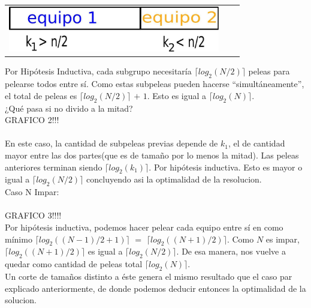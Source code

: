         {\begin{tabular}{ccc}
         \includegraphics[height=2cm]{graficos/kaioken-desarrollo-1.jpg} 

          \end{tabular}}

        Por Hipótesis Inductiva, cada subgrupo necesitaría $\lceil log_{2}(N/2) \rceil$ peleas para pelearse todos entre sí. Como estas subpeleas pueden hacerse “simultáneamente”, el total de peleas es $\lceil log_{2}(N/2) \rceil$ $+$ $1$. Esto es igual a $\lceil log_{2}(N) \rceil$. \\

        ¿Qué pasa si no divido a la mitad?\\


        GRAFICO 2!!!\\
        \\

        En este caso, la cantidad de subpeleas previas depende de $k_{1}$, el de cantidad mayor entre las dos partes(que es de tamaño por lo menos la mitad). Las peleas anteriores terminan siendo $\lceil log_{2}(k_{1}) \rceil$. Por hipótesis inductiva. Esto es mayor o igual a $\lceil log_{2}(N/2) \rceil$ concluyendo asi la optimalidad de la resolucion. \\

        Caso N Impar: \\
        \\

        GRAFICO 3!!!!
        \\

        Por hipótesis inductiva, podemos hacer pelear cada equipo entre sí en como mínimo $\lceil log_{2}((N-1)/2+1) \rceil$ $=$ $\lceil log_{2}((N+1)/2) \rceil$. Como $N$ es impar, $\lceil log_{2}((N+1)/2) \rceil$ es igual a $\lceil log_{2}(N/2) \rceil$. De esa manera, nos vuelve a quedar como cantidad de peleas total $\lceil log_{2}(N) \rceil$. \\

        Un corte de tamaños distinto a éste genera el mismo resultado que el caso par explicado anteriormente, de donde podemos deducir entonces la optimalidad de la solucion. \;






